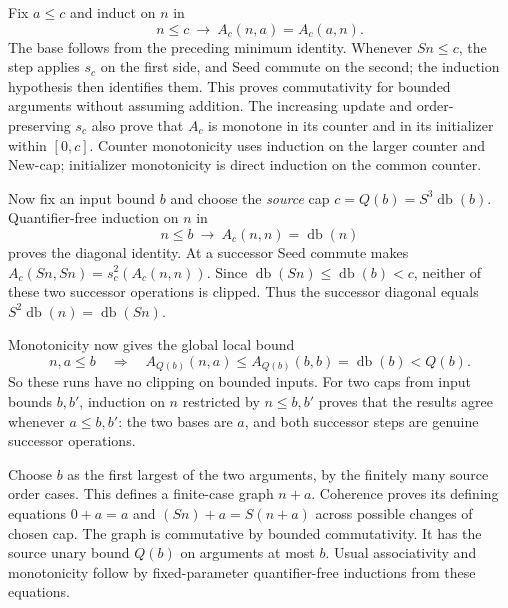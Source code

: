 Fix $a\le c$ and induct on $n$ in
\[
 n\le c\ \longrightarrow\ A_c(n,a)=A_c(a,n).
\]
The base follows from the preceding minimum identity. Whenever $Sn\le c$,
the step applies $s_c$ on the first side, and Seed commute on the
second; the induction hypothesis then identifies them. This proves
commutativity for bounded arguments without assuming addition.
The increasing update and order-preserving $s_c$ also prove that
$A_c$ is monotone in its counter and in its initializer within $[0,c]$.
Counter monotonicity uses induction on the larger counter and New-cap;
initializer monotonicity is direct induction on the common counter.

Now fix an input bound $b$ and choose the \emph{source} cap
$c=Q(b)=S^3\operatorname{db}(b)$. Quantifier-free induction on $n$ in
\[
 n\le b\ \longrightarrow\ A_c(n,n)=\operatorname{db}(n)
\]
proves the diagonal identity. At a successor Seed commute makes
$A_c(Sn,Sn)=s_c^2(A_c(n,n))$. Since
$\operatorname{db}(Sn)\le\operatorname{db}(b)<c$, neither of these
two successor operations is clipped. Thus the successor diagonal
equals $S^2\operatorname{db}(n)=\operatorname{db}(Sn)$.

Monotonicity now gives the global local bound
\[
 n,a\le b\quad\Longrightarrow\quad
 A_{Q(b)}(n,a)\le A_{Q(b)}(b,b)
   =\operatorname{db}(b)<Q(b).
 \tag{Addition bound}
\]
So these runs have no clipping on bounded inputs. For two caps from
input bounds $b,b'$, induction on $n$ restricted by $n\le b,b'$
proves that the results agree whenever $a\le b,b'$: the two bases
are $a$, and both successor steps are genuine successor operations.

Choose $b$ as the first largest of the two arguments, by the finitely
many source order cases. This defines a finite-case graph $n+a$.
Coherence proves its defining equations
$0+a=a$ and $(Sn)+a=S(n+a)$ across possible changes of chosen cap.
The graph is commutative by bounded commutativity. It has the
source unary bound $Q(b)$ on arguments at most $b$.
Usual associativity and monotonicity follow by fixed-parameter
quantifier-free inductions from these equations.

